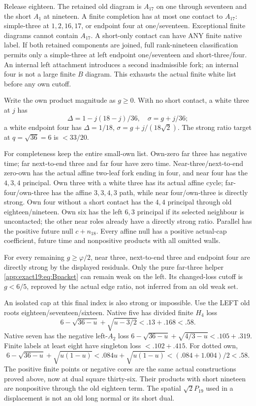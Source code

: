 \documentclass[11pt]{article}
\theoremstyle{definition}
\theoremstyle{remark}
\begin{document}
Release eighteen.
The retained old diagram is
\(A_{17}\) on one through seventeen
and the short \(A_1\) at nineteen.
A finite completion has at most
one contact to \(A_{17}\):
simple-three at \(1,2,16,17\),
or endpoint four at one/seventeen.
Exceptional finite diagrams cannot
contain \(A_{17}\).
A short-only contact can have ANY
finite native label.
If both retained components are
joined, full rank-nineteen
classification permits only a
simple-three at left endpoint
one/seventeen and short-three/four.
An internal left attachment
introduces a second inadmissible
fork; an internal four is not a
large finite \(B\) diagram.
This exhausts the actual finite
white list before any own cutoff.

Write the own product magnitude
as \(g\ge0\).
With no short contact, a white
three at \(j\) has
\[
 \Delta=1-j(18-j)/36,\quad\sigma=g+j/36;
\]
a white endpoint four has
\(\Delta=1/18\),
\(\sigma=g+j/(18\sqrt2)\).
The strong ratio target at
\(q=\sqrt{36}=6\) is \(<33/20\).

For completeness keep the entire
small-own list.
Own-zero far three has negative
time; far next-to-end three and
far four have zero time.
Near-three/next-to-end zero-own
has the actual affine two-leaf
fork ending in four, and near
four has the \(4,3,4\) principal.
Own three with a white three
has its actual affine cycle;
far-four/own-three has the affine
\(3,3,4,3\) path, while near
four/own-three is directly strong.
Own four without a short contact
has the \(4,4\) principal through
old eighteen/nineteen.
Own six has the left \(6,3\)
principal if its selected neighbour
is uncontacted; the other near
roles already have a directly
strong ratio.
Parallel has the positive future
null \(c+n_{18}\).
Every affine null has a positive
actual-cap coefficient, future
time and nonpositive products
with all omitted walls.

For every remaining \(g\ge\varphi/2\),
near three, next-to-end three
and endpoint four are directly
strong by the displayed residuals.
Only the pure far-three helper
\eqref{app:exact19:eq:Bpacket}
can remain weak on the left.
Its changed-loss cutoff is
\(g<6/5\), reproved by the actual
edge ratio, not inferred from an
old weak set.

An isolated cap at this final
index is also strong or impossible.
Use the LEFT old roots
eighteen/seventeen/sixteen.
Native five has divided finite
\(H_4\) loss
\[
        6-\sqrt{36-u}+\sqrt{u-3/2}<.13+.168<.58 .
\]
Native seven has the negative
left-\(A_2\) loss
\(6-\sqrt{36-u}+\sqrt{4/3-u}<.105+.319\).
Finite labels at least eight
have singleton loss
\(<.102+.415\).
For dotted own,
\[
 6-\sqrt{36-u}+\sqrt{u(1-u)}
       <.084u+\sqrt{u(1-u)}
       <(.084+1.004)/2<.58 .
\]
The positive finite points or
negative cores are the same actual
constructions proved above, now
at dual square thirty-six.
Their products with short nineteen
are nonpositive through the old
eighteen term.
The spatial \(\sqrt2P_{19}\) used
in a displacement is not an old
long normal or its short dual.
\end{document}
